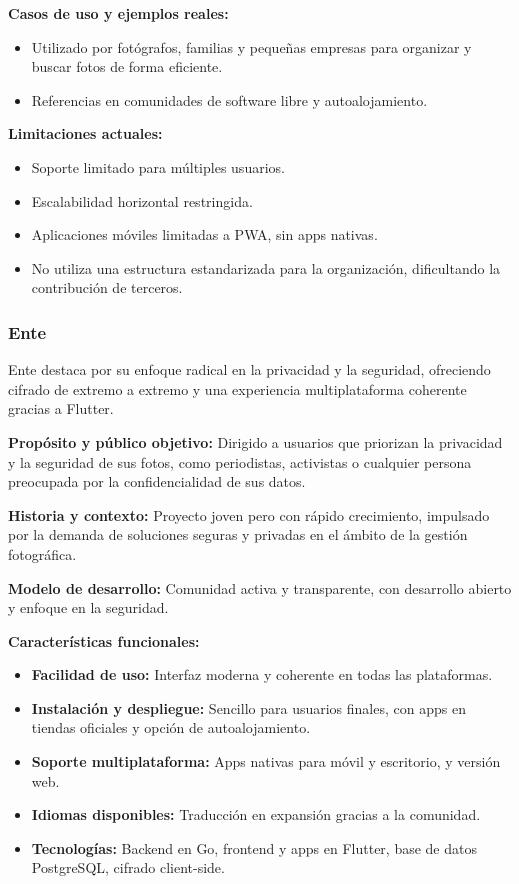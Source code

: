 \textbf{Casos de uso y ejemplos reales:}
\begin{itemize}
    \item Utilizado por fotógrafos, familias y pequeñas empresas para organizar y buscar fotos de forma eficiente.
    \item Referencias en comunidades de software libre y autoalojamiento.
\end{itemize}

\textbf{Limitaciones actuales:}
\begin{itemize}
    \item Soporte limitado para múltiples usuarios.
    \item Escalabilidad horizontal restringida.
    \item Aplicaciones móviles limitadas a PWA, sin apps nativas.
    \item No utiliza una estructura estandarizada para la organización, dificultando la contribución de terceros.
\end{itemize}

\subsubsection{Ente}

Ente destaca por su enfoque radical en la privacidad y la seguridad, ofreciendo cifrado de extremo a extremo y una experiencia multiplataforma coherente gracias a Flutter.

\textbf{Propósito y público objetivo:} Dirigido a usuarios que priorizan la privacidad y la seguridad de sus fotos, como periodistas, activistas o cualquier persona preocupada por la confidencialidad de sus datos.

\textbf{Historia y contexto:} Proyecto joven pero con rápido crecimiento, impulsado por la demanda de soluciones seguras y privadas en el ámbito de la gestión fotográfica.

\textbf{Modelo de desarrollo:} Comunidad activa y transparente, con desarrollo abierto y enfoque en la seguridad.

\textbf{Características funcionales:}
\begin{itemize}
    \item \textbf{Facilidad de uso:} Interfaz moderna y coherente en todas las plataformas.
    \item \textbf{Instalación y despliegue:} Sencillo para usuarios finales, con apps en tiendas oficiales y opción de autoalojamiento.
    \item \textbf{Soporte multiplataforma:} Apps nativas para móvil y escritorio, y versión web.
    \item \textbf{Idiomas disponibles:} Traducción en expansión gracias a la comunidad.
    \item \textbf{Tecnologías:} Backend en Go, frontend y apps en Flutter, base de datos PostgreSQL, cifrado client-side.
\end{itemize}

